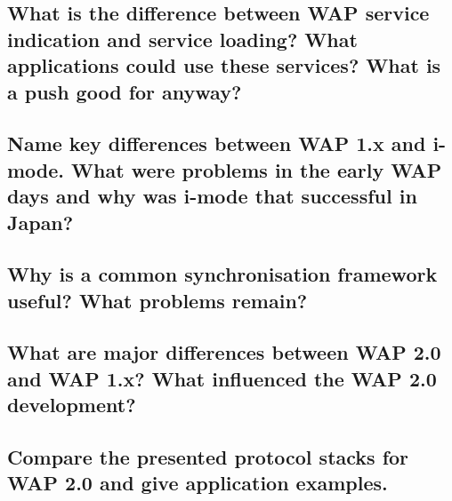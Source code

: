 \subsection{What is the difference between WAP service indication and service loading? What
applications could use these services? What is a push good for anyway?}

\subsection{Name key differences between WAP 1.x and i-mode. What were problems in the
early WAP days and why was i-mode that successful in Japan?}

\subsection{Why is a common synchronisation framework useful? What problems remain?}

\subsection{What are major differences between WAP 2.0 and WAP 1.x? What influenced the
WAP 2.0 development?}

\subsection{Compare the presented protocol stacks for WAP 2.0 and give application examples.}




